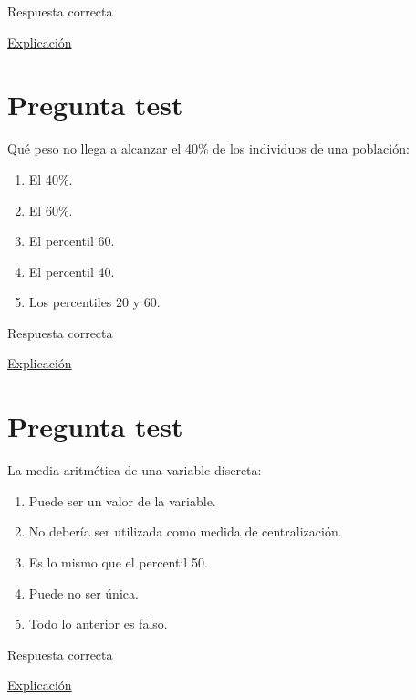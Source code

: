 \documentclass[
]{book}
\providecommand{\tightlist}{%
  \setlength{\itemsep}{0pt}\setlength{\parskip}{0pt}}
\begin{document}
Respuesta correcta

\href{https://1fjmanzano.github.io/bioestadistica/medidas-de-posicio\%CC\%81n-dispersio\%CC\%81n-y-forma.html\#medidas-de-posicio\%CC\%81n-no-centrales}{Explicación}

\hypertarget{pregunta-test-72}{%
\section{Pregunta test}\label{pregunta-test-72}}

Qué peso no llega a alcanzar el 40\% de los individuos de una población:

\begin{enumerate}
\def\labelenumi{\alph{enumi})}
\tightlist
\item
  El 40\%.
\item
  El 60\%.
\item
  El percentil 60.
\item
  El percentil 40.
\item
  Los percentiles 20 y 60.
\end{enumerate}

Respuesta correcta

\href{https://1fjmanzano.github.io/bioestadistica/medidas-de-posicio\%CC\%81n-dispersio\%CC\%81n-y-forma.html\#medidas-de-posicio\%CC\%81n-no-centrales}{Explicación}

\hypertarget{pregunta-test-73}{%
\section{Pregunta test}\label{pregunta-test-73}}

La media aritmética de una variable discreta:

\begin{enumerate}
\def\labelenumi{\alph{enumi})}
\tightlist
\item
  Puede ser un valor de la variable.
\item
  No debería ser utilizada como medida de centralización.
\item
  Es lo mismo que el percentil 50.
\item
  Puede no ser única.
\item
  Todo lo anterior es falso.
\end{enumerate}

Respuesta correcta

\href{https://1fjmanzano.github.io/bioestadistica/medidas-de-posicio\%CC\%81n-dispersio\%CC\%81n-y-forma.html\#medidas-de-posicio\%CC\%81n-centrales}{Explicación}
\end{document}
